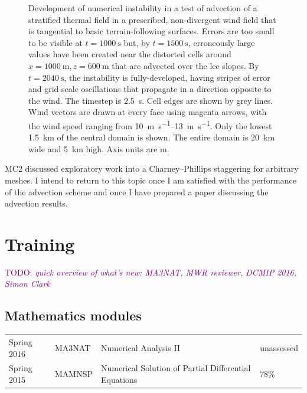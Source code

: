 \documentclass[a4paper,11pt]{article}
\newcommand{\TODO}[1]{\textcolor{purple}{TODO: \emph{#1}}}
\begin{document}
\begin{figure}
%
\caption{Development of numerical instability in a test of advection of a stratified thermal field in a prescribed, non-divergent wind field that is tangential to basic terrain-following surfaces.  Errors are too small to be visible at $t = \SI{1000}{\second}$ but, by $t = \SI{1500}{\second}$, erroneously large values have been created near the distorted cells around $x = \SI{1000}{\meter}, z = \SI{600}{\meter}$ that are advected over the lee slopes.  By $t = \SI{2040}{\second}$, the instability is fully-developed, having stripes of error and grid-scale oscillations that propagate in a direction opposite to the wind.  The timestep is \SI{2.5}{\second}.
Cell edges are shown by grey lines.  Wind vectors are drawn at every face using magenta arrows, with the wind speed ranging from \SIrange{10}{13}{\meter\per\second}.  Only the lowest \SI{1.5}{\kilo\meter} of the central domain is shown.  The entire domain is \SI{20}{\kilo\meter} wide and \SI{5}{\kilo\meter} high.  Axis units are \si{\meter}.}
\label{fig:instability}
\end{figure}

MC2 discussed exploratory work into a Charney--Phillips staggering for arbitrary meshes.  I intend to return to this topic once I am satisfied with the performance of the advection scheme and once I have prepared a paper discussing the advection results.



\section{Training}
\TODO{quick overview of what's new: MA3NAT, MWR reviewer, DCMIP 2016, Simon Clark}

\subsection*{Mathematics modules}
\begin{tabular}{l l l l}
Spring 2016	& MA3NAT & Numerical Analysis II & unassessed \\
Spring 2015	& MAMNSP & Numerical Solution of Partial Differential Equations  & 78\% \\
\end{tabular}
\end{document}
